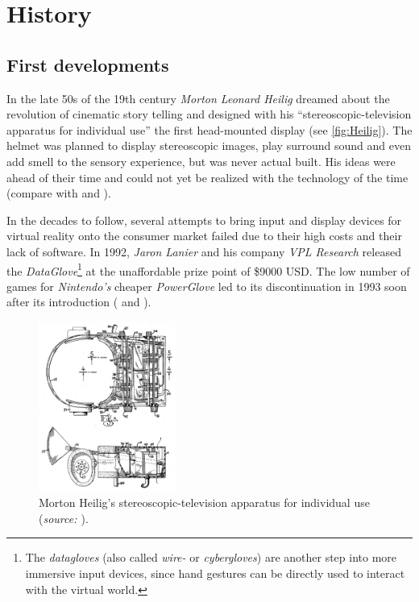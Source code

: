 \section{History}\label{sec:history}
\subsection{First developments}
In the late 50s of the 19th century \textit{Morton Leonard Heilig} dreamed about the revolution of cinematic story telling and designed with his \enquote{stereoscopic-television apparatus for individual use} the first head-mounted display (see \autoref{fig:Heilig}). The helmet was planned to display stereoscopic images, play surround sound and even add smell to the sensory experience, but was never actual built. His ideas were ahead of their time and could not yet be realized with the technology of the time (compare with \cite[p.3]{Toennis.2010} and \cite[p.4 et seq.]{Burdea.2003}). 

In the decades to follow, several attempts to bring input and display devices for virtual reality onto the consumer market failed due to their high costs and their lack of software. In 1992, \textit{Jaron Lanier} and his company \textit{VPL Research} released the \textit{DataGlove}\footnote{The \textit{datagloves} (also called \textit{wire-} or \textit{cybergloves}) are another step into more immersive input devices, since hand gestures can be directly used to interact with the virtual world.} at the unaffordable prize point of \$9000 USD. The low number of games for \textit{Nintendo's} cheaper \textit{PowerGlove} led to its discontinuation in 1993 soon after its introduction (\cite[p.8 et seq.]{Burdea.2003} and \cite[p.19 et seq.]{Doerner.2013}).

\begin{figure}[htbp]
		\centering
		\includegraphics[width=0.4\textwidth]{figures/Heilig_HMD}
		\caption[Stereoscopic-television apparatus for individual use]{Morton Heilig's stereoscopic-television apparatus for individual use (\textit{source: \cite{Heilig.1957}}).}
		\label{fig:Heilig}
\end{figure}

